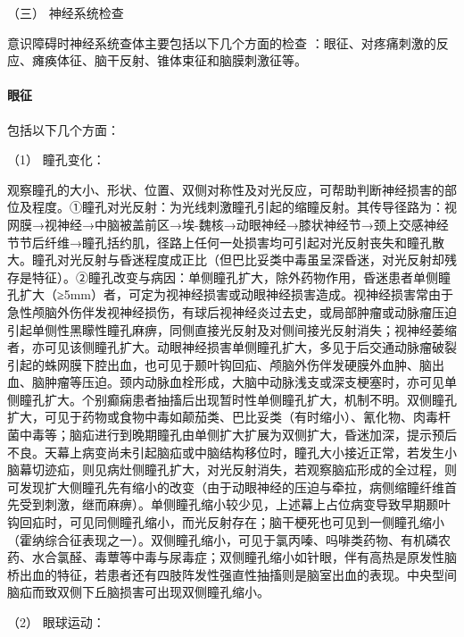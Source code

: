\hypertarget{text00010.htmlux5cux23CHP1-2-2-1-3}{}
（三） 神经系统检查

意识障碍时神经系统查体主要包括以下几个方面的检查
：眼征、对疼痛刺激的反应、瘫痪体征、脑干反射、锥体束征和脑膜刺激征等。

\paragraph{眼征}

包括以下几个方面：

\hypertarget{text00010.htmlux5cux23CHP1-2-2-1-3-1-1}{}
（1） 瞳孔变化：

观察瞳孔的大小、形状、位置、双侧对称性及对光反应，可帮助判断神经损害的部位及程度。①瞳孔对光反射：为光线刺激瞳孔引起的缩瞳反射。其传导径路为：视网膜→视神经→中脑被盖前区→埃-魏核→动眼神经→膝状神经节→颈上交感神经节节后纤维→瞳孔括约肌，径路上任何一处损害均可引起对光反射丧失和瞳孔散大。瞳孔对光反射与昏迷程度成正比（但巴比妥类中毒虽呈深昏迷，对光反射却残存是特征）。②瞳孔改变与病因：单侧瞳孔扩大，除外药物作用，昏迷患者单侧瞳孔扩大（≥5mm）者，可定为视神经损害或动眼神经损害造成。视神经损害常由于急性颅脑外伤伴发视神经损伤，有球后视神经炎过去史，或局部肿瘤或动脉瘤压迫引起单侧性黑矇性瞳孔麻痹，同侧直接光反射及对侧间接光反射消失；视神经萎缩者，亦可见该侧瞳孔扩大。动眼神经损害单侧瞳孔扩大，多见于后交通动脉瘤破裂引起的蛛网膜下腔出血，也可见于颞叶钩回疝、颅脑外伤伴发硬膜外血肿、脑出血、脑肿瘤等压迫。颈内动脉血栓形成，大脑中动脉浅支或深支梗塞时，亦可见单侧瞳孔扩大。个别癫痫患者抽搐后出现暂时性单侧瞳孔扩大，机制不明。双侧瞳孔扩大，可见于药物或食物中毒如颠茄类、巴比妥类（有时缩小）、氰化物、肉毒杆菌中毒等；脑疝进行到晚期瞳孔由单侧扩大扩展为双侧扩大，昏迷加深，提示预后不良。天幕上病变尚未引起脑疝或中脑结构移位时，瞳孔大小接近正常，若发生小脑幕切迹疝，则见病灶侧瞳孔扩大，对光反射消失，若观察脑疝形成的全过程，则可发现扩大侧瞳孔先有缩小的改变（由于动眼神经的压迫与牵拉，病侧缩瞳纤维首先受到刺激，继而麻痹）。单侧瞳孔缩小较少见，上述幕上占位病变导致早期颞叶钩回疝时，可见同侧瞳孔缩小，而光反射存在；脑干梗死也可见到一侧瞳孔缩小（霍纳综合征表现之一）。双侧瞳孔缩小，可见于氯丙嗪、吗啡类药物、有机磷农药、水合氯醛、毒蕈等中毒与尿毒症；双侧瞳孔缩小如针眼，伴有高热是原发性脑桥出血的特征，若患者还有四肢阵发性强直性抽搐则是脑室出血的表现。中央型间脑疝而致双侧下丘脑损害可出现双侧瞳孔缩小。

\hypertarget{text00010.htmlux5cux23CHP1-2-2-1-3-1-2}{}
（2） 眼球运动：

